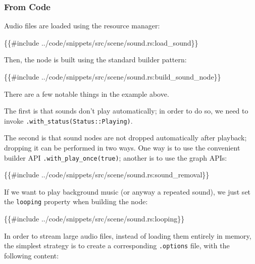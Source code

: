 \documentclass[
]{book}
\newenvironment{Shaded}{\begin{snugshade}}{\end{snugshade}}
\newcommand{\NormalTok}[1]{#1}
\theoremstyle{definition}
\theoremstyle{definition}
\theoremstyle{definition}
\theoremstyle{definition}
\theoremstyle{remark}
\begin{document}
\subsubsection{From Code}\label{from-code}

Audio files are loaded using the resource manager:

\begin{Shaded}
\begin{Highlighting}[]
\NormalTok{\{\{\#include ../code/snippets/src/scene/sound.rs:load\_sound\}\}}
\end{Highlighting}
\end{Shaded}

Then, the node is built using the standard builder pattern:

\begin{Shaded}
\begin{Highlighting}[]
\NormalTok{\{\{\#include ../code/snippets/src/scene/sound.rs:build\_sound\_node\}\}}
\end{Highlighting}
\end{Shaded}

There are a few notable things in the example above.

The first is that sounds don't play automatically; in order to do so, we need to invoke \texttt{.with\_status(Status::Playing)}.

The second is that sound nodes are not dropped automatically after playback; dropping it can be performed in two ways. One way is to use the convenient builder API \texttt{.with\_play\_once(true)}; another is to use the graph APIs:

\begin{Shaded}
\begin{Highlighting}[]
\NormalTok{\{\{\#include ../code/snippets/src/scene/sound.rs:sound\_removal\}\}}
\end{Highlighting}
\end{Shaded}

If we want to play background music (or anyway a repeated sound), we just set the \texttt{looping} property when building the node:

\begin{Shaded}
\begin{Highlighting}[]
\NormalTok{\{\{\#include ../code/snippets/src/scene/sound.rs:looping\}\}}
\end{Highlighting}
\end{Shaded}

In order to stream large audio files, instead of loading them entirely in memory, the simplest strategy is to create a corresponding \texttt{.options} file, with the following content:
\end{document}
